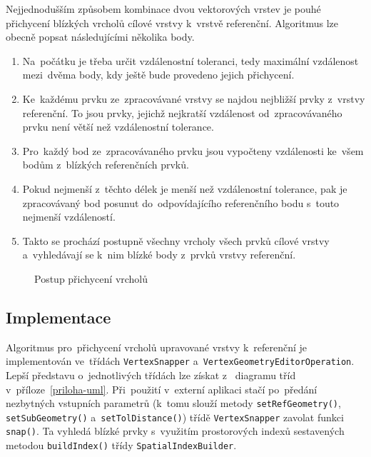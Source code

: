 Nejjednodušším způsobem kombinace dvou vektorových vrstev je pouhé přichycení 
blízkých vrcholů cílové vrstvy k~vrstvě referenční. Algoritmus lze obecně 
popsat následujícími několika body.

\begin{enumerate}
 \item Na~počátku je třeba určit vzdálenostní toleranci, tedy maximální 
    vzdálenost mezi~dvěma body, kdy ještě bude provedeno jejich přichycení.
 \item Ke~každému prvku ze~zpracovávané vrstvy se najdou nejbližší prvky 
    z~vrstvy referenční. To jsou prvky, jejichž nejkratší vzdálenost 
    od~zpracovávaného prvku není větší	než vzdálenostní tolerance.
 \item Pro~každý bod ze~zpracovávaného prvku jsou vypočteny vzdálenosti 
    ke~všem bodům z~blízkých referenčních prvků.
 \item Pokud nejmenší z~těchto délek je menší než vzdálenostní tolerance, 
    pak je zpracovávaný bod posunut do~odpovídajícího referenčního bodu 
    s~touto nejmenší vzdáleností.
 \item Takto se prochází postupně všechny vrcholy všech prvků cílové vrstvy 
    a~vyhledávají se k~nim blízké body z~prvků vrstvy referenční. 
\end{enumerate}

  \begin{figure}[H]
    \centering
      
      \caption{Postup přichycení vrcholů}
      \label{fig:vs-princip}
  \end{figure}


\subsection{Implementace}
\label{vs-implementace}
Algoritmus pro~přichycení vrcholů upravované vrstvy k~referenční 
je implementován ve~třídách \texttt{Vertex\-Snapper} 
a~\texttt{Vertex\-Geometry\-Editor\-Operation}. Lepší představu 
o~jednotlivých třídách lze získat z~ diagramu  tříd
v~příloze~\ref{priloha-uml}. Při~po\-užití v~externí aplikaci 
stačí po~pře\-dání nezbytných vstupních parametrů (k~tomu 
slouží metody \texttt{setRefGeometry()}, \texttt{setSubGeometry()} 
a~\texttt{setTolDistance()}) třídě \texttt{Vertex\-Snapper} zavolat 
funkci \texttt{snap()}. Ta vyhledá blízké prvky s~využitím prostorových 
indexů sesta\-vených metodou \texttt{build\-Index()} třídy 
\texttt{Spatial\-Index\-Builder}.

